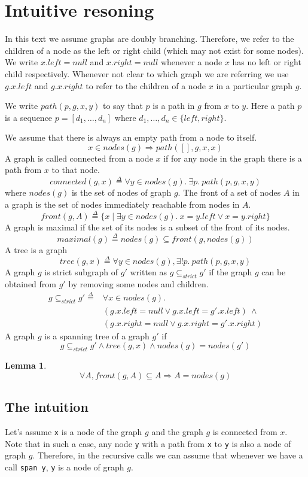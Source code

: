 \documentclass[nocopyrightspace]{sigplanconf}
\newtheorem{lemma}{Lemma}
\def\MyMLe{\lstinline[language=MyML, basicstyle=\small\ttfamily]}
\newcommand{\defeq}{\overset{\Delta}{=}}
\newcommand{\path}{\mathit{path}}
\newcommand{\connected}{\mathit{connected}}
\newcommand{\nodes}{\mathit{nodes}}
\newcommand{\front}{\mathit{front}}
\newcommand{\maximal}{\mathit{maximal}}
\newcommand{\Left}{\mathit{left}}
\newcommand{\Right}{\mathit{right}}
\newcommand{\tree}{\mathit{tree}}
\newcommand{\Null}{\mathit{null}}
\newcommand{\strictSG}{\subseteq_{\mathit{strict}}}
\begin{document}
\section{Intuitive resoning}
In this text we assume graphs are doubly branching.
Therefore, we refer to the children of a node as the left or right child (which may not exist for some nodes).
We write $x.\Left = \Null$ and $x.\Right = \Null$ whenever a node $x$ has no left or right child respectively.
Whenever not clear to which graph we are referring we use $g.x.\Left$ and $g.x.\Right$ to refer to the children of a node $x$ in a particular graph $g$.

We write $\path(p, g, x, y)$ to say that $p$ is a path in $g$ from $x$ to $y$.
Here a path $p$ is a sequence
$p = [d_1, \dots, d_n ]$ where $d_1,\dots, d_n \in \{\Left, \Right\}$.

We assume that there is always an empty path from a node to itself.
\[
x \in \nodes(g) \Rightarrow \path([], g, x, x)
\]
A graph is called connected from a node $x$ if for any node in the graph there is a path from $x$ to that node.
\[
\connected(g, x) \defeq \forall y \in \nodes(g).~ \exists p.~\path(p, g, x, y)
\]
where $\nodes(g)$ is the set of nodes of graph $g$.
The front of a set of nodes $A$ in a graph is the set of nodes immediately reachable from nodes in $A$.
\[
\front(g, A) \defeq \{x \mid \exists y \in \nodes(g).~x = y.\Left \lor x = y.\Right \}
\]
A graph is maximal if the set of its nodes is a subset of the front of its nodes.
\[
\maximal(g) \defeq \nodes(g) \subseteq \front(g, \nodes(g))
\]
A tree is a graph
\[
\tree(g, x) \defeq \forall y \in \nodes(g), \exists! p.~\path(p, g, x, y)
\]
A graph $g$ is strict subgraph of $g'$ written as $g \strictSG g'$
if the graph $g$ can be obtained from $g'$ by removing some nodes and children.
\[
\begin{array}{ll}
g \strictSG g' \defeq & \forall x \in \nodes(g).\\
& (g.x.\Left = \Null \lor g.x.\Left = g'.x.\Left)~\land \\
& (g.x.\Right = \Null \lor g.x.\Right = g'.x.\Right)
\end{array}
\]
A graph $g$ is a spanning tree of a graph $g'$ if
\[
g \strictSG g' \land \tree(g, x) \land \nodes(g) = \nodes(g')
\]
\begin{lemma}\label{lem:in_front_nodes}
\[
\forall A, \front(g, A) \subseteq A \Rightarrow A = \nodes(g)
\]
\end{lemma}
\subsection{The intuition}
Let's assume \MyMLe{x} is a node of the graph $g$ and the graph $g$ is connected from $x$.
Note that in such a case, any node \MyMLe{y} with a path from \MyMLe{x} to \MyMLe{y} is also a node of graph $g$.
Therefore, in the recursive calls we can assume that whenever we have a call \MyMLe{span y}, \MyMLe{y} is a node of graph $g$.
\end{document}
